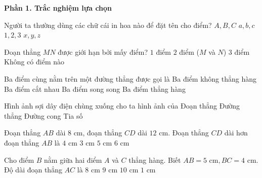\textbf{Phần 1. Trắc nghiệm lựa chọn}

\begin{ex} %
Người ta thường dùng các chữ cái in hoa nào để đặt tên cho điểm?
\choice
{\True $A, B, C$}
{$a, b, c$}
{$1, 2, 3$}
{$x, y, z$}
\end{ex}

\begin{ex} %
Đoạn thẳng $MN$ được giới hạn bởi mấy điểm?
\choice
{$1$ điểm}
{\True $2$ điểm ($M$ và $N$)}
{$3$ điểm}
{Không có điểm nào}
\end{ex}

\begin{ex} %
Ba điểm cùng nằm trên một đường thẳng được gọi là
\choice
{Ba điểm không thẳng hàng}
{Ba điểm cắt nhau}
{Ba điểm song song}
{\True Ba điểm thẳng hàng}
\end{ex}

\begin{ex} %
Hình ảnh sợi dây điện chùng xuống cho ta hình ảnh của
\choice
{Đoạn thẳng}
{Đường thẳng}
{\True Đường cong}
{Tia số}
\end{ex}

\begin{ex} %
Đoạn thẳng $AB$ dài $8\text{ cm}$, đoạn thẳng $CD$ dài $12\text{ cm}$. Đoạn thẳng $CD$ dài hơn đoạn thẳng $AB$ là
\choice
{\True $4\text{ cm}$}
{$3\text{ cm}$}
{$5\text{ cm}$}
{$6\text{ cm}$}
\end{ex}

\begin{ex} %
Cho điểm $B$ nằm giữa hai điểm $A$ và $C$ thẳng hàng. Biết $AB = 5\text{ cm}, BC = 4\text{ cm}$. Độ dài đoạn thẳng $AC$ là
\choice
{$8\text{ cm}$}
{\True $9\text{ cm}$}
{$10\text{ cm}$}
{$1\text{ cm}$}
\end{ex}

